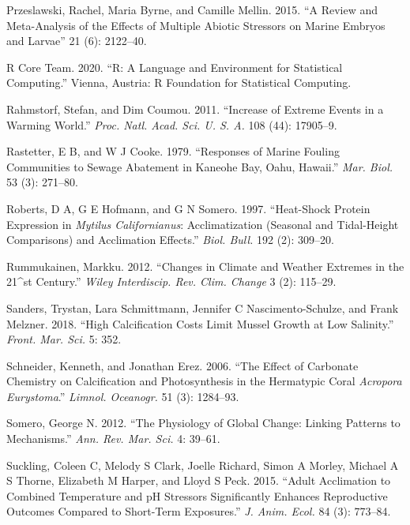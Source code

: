\documentclass[smallextended]{svjour3}       %
\newlength{\cslhangindent}
\newenvironment{CSLReferences}[2] %
 {%
  \setlength{\parindent}{0pt}
  \ifodd #1 \everypar{\setlength{\hangindent}{\cslhangindent}}\ignorespaces\fi
  \ifnum #2 > 0
  \setlength{\parskip}{#2\baselineskip}
  \fi
 }%
 {}
\begin{document}
\begin{CSLReferences}{1}{0}
\leavevmode{}%
Przeslawski, Rachel, Maria Byrne, and Camille Mellin. 2015. {``A Review
and Meta-Analysis of the Effects of Multiple Abiotic Stressors on Marine
Embryos and Larvae''} 21 (6): 2122--40.

\leavevmode{}%
R Core Team. 2020. {``R: A Language and Environment for Statistical
Computing.''} Vienna, Austria: R Foundation for Statistical Computing.

\leavevmode{}%
Rahmstorf, Stefan, and Dim Coumou. 2011. {``Increase of Extreme Events
in a Warming World.''} \emph{Proc. Natl. Acad. Sci. U. S. A.} 108 (44):
17905--9.

\leavevmode{}%
Rastetter, E B, and W J Cooke. 1979. {``Responses of Marine Fouling
Communities to Sewage Abatement in Kaneohe Bay, Oahu, Hawaii.''}
\emph{Mar. Biol.} 53 (3): 271--80.

\leavevmode{}%
Roberts, D A, G E Hofmann, and G N Somero. 1997. {``Heat-Shock Protein
Expression in \emph{Mytilus Californianus}: Acclimatization (Seasonal
and Tidal-Height Comparisons) and Acclimation Effects.''} \emph{Biol.
Bull.} 192 (2): 309--20.

\leavevmode{}%
Rummukainen, Markku. 2012. {``Changes in Climate and Weather Extremes in
the 21\^{}{st} Century.''} \emph{Wiley Interdiscip. Rev. Clim. Change} 3
(2): 115--29.

\leavevmode{}%
Sanders, Trystan, Lara Schmittmann, Jennifer C Nascimento-Schulze, and
Frank Melzner. 2018. {``High Calcification Costs Limit Mussel Growth at
Low Salinity.''} \emph{Front. Mar. Sci.} 5: 352.

\leavevmode{}%
Schneider, Kenneth, and Jonathan Erez. 2006. {``The Effect of Carbonate
Chemistry on Calcification and Photosynthesis in the Hermatypic Coral
\emph{Acropora Eurystoma}.''} \emph{Limnol. Oceanogr.} 51 (3): 1284--93.

\leavevmode{}%
Somero, George N. 2012. {``The Physiology of Global Change: Linking
Patterns to Mechanisms.''} \emph{Ann. Rev. Mar. Sci.} 4: 39--61.

\leavevmode{}%
Suckling, Coleen C, Melody S Clark, Joelle Richard, Simon A Morley,
Michael A S Thorne, Elizabeth M Harper, and Lloyd S Peck. 2015. {``Adult
Acclimation to Combined Temperature and pH Stressors Significantly
Enhances Reproductive Outcomes Compared to Short-Term Exposures.''}
\emph{J. Anim. Ecol.} 84 (3): 773--84.


\end{CSLReferences}
\end{document}
